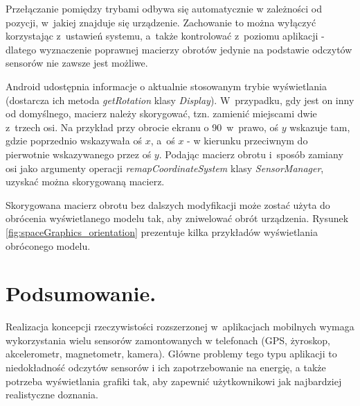 \documentclass[a4paper,twocolumn,11pt]{article}
\begin{document}
 Przełączanie pomiędzy trybami odbywa się automatycznie w zależności od pozycji, w~jakiej znajduje się urządzenie.
 Zachowanie to można wyłączyć korzystając z~ustawień systemu, a~także kontrolować z~poziomu aplikacji - dlatego wyznaczenie poprawnej macierzy obrotów jedynie na podstawie odczytów sensorów nie zawsze jest możliwe.
 
 Android udostępnia informacje o aktualnie stosowanym trybie wyświetlania (dostarcza ich metoda \emph{getRotation} klasy \emph{Display}).
 W~przypadku, gdy jest on inny od domyślnego, macierz należy skorygować, tzn. zamienić miejscami dwie z~trzech osi.
 Na przykład przy obrocie ekranu o 90\textdegree~w~prawo, oś $y$ wskazuje tam, gdzie poprzednio wskazywała oś $x$, a~oś $x$ - w kierunku przeciwnym do pierwotnie wskazywanego przez oś $y$.
 Podając macierz obrotu i~sposób zamiany osi jako argumenty operacji \emph{remapCoordinateSystem} klasy \emph{SensorManager}, uzyskać można skorygowaną macierz.

 Skorygowana macierz obrotu bez dalszych modyfikacji może zostać użyta do obrócenia wyświetlanego modelu tak, aby zniwelować obrót urządzenia.
 Rysunek \ref{fig:spaceGraphics_orientation} prezentuje kilka przykładów wyświetlania obróconego modelu.
 
 




\section{Podsumowanie.} \label{sec:summary}

Realizacja koncepcji rzeczywistości rozszerzonej w~aplikacjach mobilnych wymaga wykorzystania wielu sensorów zamontowanych w telefonach (GPS, żyroskop, akcelerometr, magnetometr, kamera).
Główne problemy tego typu aplikacji to niedokładność odczytów sensorów i ich zapotrzebowanie na energię, a także potrzeba wyświetlania grafiki tak, aby zapewnić użytkownikowi jak najbardziej realistyczne doznania.

\end{document}
